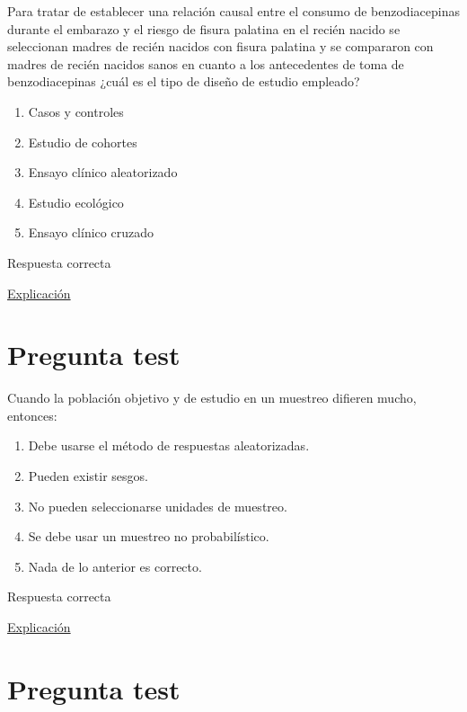 \documentclass[
]{book}
\providecommand{\tightlist}{%
  \setlength{\itemsep}{0pt}\setlength{\parskip}{0pt}}
\begin{document}
Para tratar de establecer una relación causal entre el consumo de benzodiacepinas durante el embarazo y el riesgo de fisura palatina en el recién nacido se seleccionan madres de recién nacidos con fisura palatina y se compararon con madres de recién nacidos sanos en cuanto a los antecedentes de toma de benzodiacepinas ¿cuál es el tipo de diseño de estudio empleado?

\begin{enumerate}
\def\labelenumi{\alph{enumi})}
\tightlist
\item
  Casos y controles
\item
  Estudio de cohortes
\item
  Ensayo clínico aleatorizado
\item
  Estudio ecológico
\item
  Ensayo clínico cruzado
\end{enumerate}

Respuesta correcta

\href{http://www.scielo.org.pe/scielo.php?script=sci_arttext\&pid=S2308-05312020000100138}{Explicación}

\hypertarget{pregunta-test-45}{%
\section{Pregunta test}\label{pregunta-test-45}}

Cuando la población objetivo y de estudio en un muestreo difieren mucho, entonces:

\begin{enumerate}
\def\labelenumi{\alph{enumi})}
\tightlist
\item
  Debe usarse el método de respuestas aleatorizadas.
\item
  Pueden existir sesgos.
\item
  No pueden seleccionarse unidades de muestreo.
\item
  Se debe usar un muestreo no probabilístico.
\item
  Nada de lo anterior es correcto.
\end{enumerate}

Respuesta correcta

\href{https://www.cancer.gov/espanol/publicaciones/diccionarios/diccionario-cancer/def/sesgo}{Explicación}

\hypertarget{pregunta-test-46}{%
\section{Pregunta test}\label{pregunta-test-46}}
\end{document}
